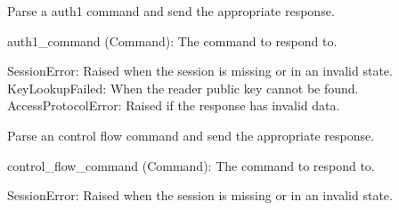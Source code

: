 \documentclass[letterpaper,10pt,english]{sphinxmanual}
\begin{document}
\begin{fulllineitems}
\begin{fulllineitems}
\label{\detokenize{aliro_actuator.access_protocol.user_device:aliro_actuator.access_protocol.user_device.UserDevice.handle_auth1}}
\pysigstartsignatures
{}
\pysigstopsignatures
\sphinxAtStartPar
Parse a auth1 command and send the appropriate response.
\begin{description}
\sphinxAtStartPar
auth1\_command (Command): The command to respond to.

\sphinxAtStartPar
SessionError: Raised when the session is missing or in an invalid state.
KeyLookupFailed: When the reader public key cannot be found.
AccessProtocolError: Raised if the response has invalid data.

\end{description}

\end{fulllineitems}


\begin{fulllineitems}
\label{\detokenize{aliro_actuator.access_protocol.user_device:aliro_actuator.access_protocol.user_device.UserDevice.handle_control_flow}}
\pysigstartsignatures
{}
\pysigstopsignatures
\sphinxAtStartPar
Parse an control flow command and send the appropriate response.
\begin{description}
\sphinxAtStartPar
control\_flow\_command (Command): The command to respond to.

\sphinxAtStartPar
SessionError: Raised when the session is missing or in an invalid state.


\end{description}
\end{fulllineitems}
\end{fulllineitems}
\end{document}
